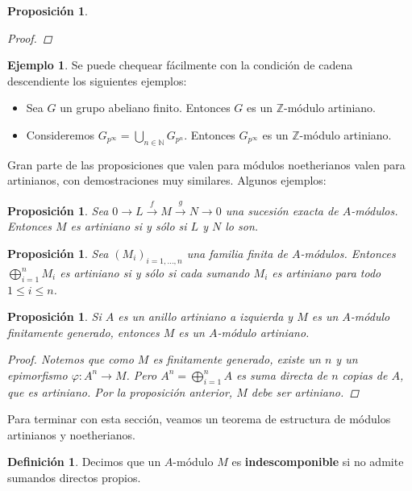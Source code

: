 \documentclass[12pt]{book}
\newtheorem{prop}[teo]{Proposición}
\theoremstyle{definition}
\newtheorem{defn}[teo]{Definición}
\newtheorem{ex}[teo]{Ejemplo}
\newcommand{\ZZ}{\mathbb{Z}}      %
\begin{document}
\begin{prop}
\begin{proof}
\end{proof}
\end{prop}

\begin{ex}Se puede chequear fácilmente con la condición de cadena descendiente los siguientes ejemplos:
\begin{itemize}\item Sea $G$ un grupo abeliano finito. Entonces $G$ es un $\ZZ$-módulo artiniano.
\item Consideremos $G_{p^{\infty}} = \displaystyle\bigcup_{n\in\mathbb{N}}G_{p^n}$. Entonces $G_{p^{\infty}}$ es un $\ZZ$-módulo artiniano.\end{itemize}
\end{ex}

Gran parte de las proposiciones que valen para módulos noetherianos valen para artinianos, con demostraciones muy similares. Algunos ejemplos:

\begin{prop}
Sea $0\longrightarrow L\stackrel{f}{\longrightarrow} M\stackrel{g}{\longrightarrow} N\longrightarrow 0$ una sucesión exacta de $A$-módulos. Entonces $M$ es artiniano si y sólo si $L$ y $N$ lo son.
\end{prop}

\begin{prop}
Sea $(M_i)_{i=1,\ldots , n}$ una familia finita de $A$-módulos. Entonces $\displaystyle\bigoplus_{i=1}^n M_i$ es artiniano si y sólo si cada sumando $M_i$ es artiniano para todo $1\leq i\leq n$.
\end{prop}

\begin{prop}
Si $A$ es un anillo artiniano a izquierda y $M$ es un $A$-módulo finitamente generado, entonces $M$ es un $A$-módulo artiniano.
\begin{proof}
Notemos que como $M$ es finitamente generado, existe un $n$ y un epimorfismo $\varphi:A^n\to M$. Pero $A^n=\displaystyle\bigoplus_{i=1}^n A$ es suma directa de $n$ copias de $A$, que es artiniano. Por la proposición anterior, $M$ debe ser artiniano.
\end{proof}
\end{prop}

Para terminar con esta sección, veamos un teorema de estructura de módulos artinianos y noetherianos.

\begin{defn}
Decimos que un $A$-módulo $M$ es \textbf{indescomponible} si no admite sumandos directos propios.
\end{defn}
\end{document}
